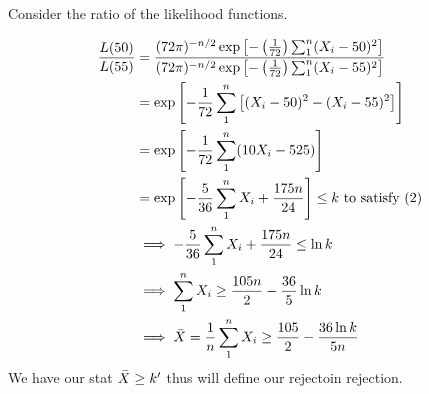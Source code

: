 \nl Consider the ratio of the likelihood functions.

\begin{align*}
    \frac{L(50)}{L(55)}
    &= \dfrac{(72 \pi)^{-n/2} \exp \brac{-\pars{\over{72}} \sum_1^n (X_i - 50)^2} }{{(72 \pi)^{-n/2} \exp \brac{-\pars{\over{72}} \sum_1^n (X_i - 55)^2} }}\\
    &= \exp \brac{ - \over{72} \sum_1^n \brac{(X_i-50)^2-(X_i-55)^2}}\\
    &= \exp \brac{-\over{72} \sum_1^n (10X_i -525) }\\
    &= \exp \brac{-\frac{5}{36} \sum_1^n X_i + \frac{175n}{24}} \leq k \text{ to satisfy (2)}\\
    & \implies -\frac{5}{36} \sum_1^n X_i + \frac{175n}{24} \leq \ln k\\
    & \implies \sum_1^n X_i \geq \frac{105n}
    {2} - \frac{36}{5} \ln k
    \\ & \implies \Xbar = \over{n}\sum_1^n X_i \geq \frac{105}{2} - \frac{36\ln k}{5n}
\end{align*}
We have our stat $\bar{X} \geq k'$ thus will define our rejectoin rejection.














